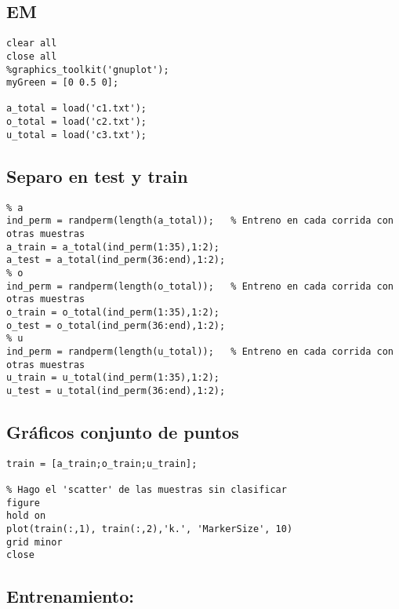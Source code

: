 \tableofcontents
\vspace*{4em}



{}
\subsection*{EM}

\begin{lstlisting}
clear all
close all
%graphics_toolkit('gnuplot');
myGreen = [0 0.5 0];

a_total = load('c1.txt');
o_total = load('c2.txt');
u_total = load('c3.txt');
\end{lstlisting}


{}
\subsection*{Separo en test y train}


\begin{lstlisting}
% a
ind_perm = randperm(length(a_total));	% Entreno en cada corrida con otras muestras
a_train = a_total(ind_perm(1:35),1:2);
a_test = a_total(ind_perm(36:end),1:2);
% o
ind_perm = randperm(length(o_total));	% Entreno en cada corrida con otras muestras
o_train = o_total(ind_perm(1:35),1:2);
o_test = o_total(ind_perm(36:end),1:2);
% u
ind_perm = randperm(length(u_total));	% Entreno en cada corrida con otras muestras
u_train = u_total(ind_perm(1:35),1:2);
u_test = u_total(ind_perm(36:end),1:2);
\end{lstlisting}


{}
\subsection*{Gráficos conjunto de puntos}

\begin{lstlisting}
train = [a_train;o_train;u_train];

% Hago el 'scatter' de las muestras sin clasificar
figure
hold on
plot(train(:,1), train(:,2),'k.', 'MarkerSize', 10)
grid minor
close
\end{lstlisting}


{}
\subsection*{Entrenamiento:}



